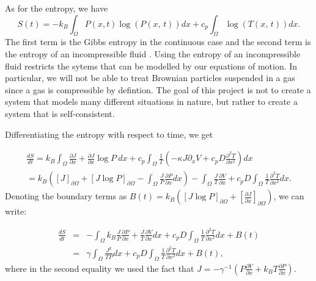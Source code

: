 As for the entropy, we have \cite{Streater1997a}
\begin{equation}
S(t) = -k_B \int_{\Omega} P(x, t) \log(P(x, \, t)) dx + c_p \int_{\Omega} \log(T(x, \, t)) dx.
\end{equation}
The first term is the Gibbs entropy in the continuous case \cite{Jaynes1965} and the second term is the entropy of an incompressible fluid \cite{CengelBoles1994}. Using the entropy of an incompressible fluid restricts the sytems that can be modelled by our equations of motion. In particular, we will not be able to treat Brownian particles suspended in a gas since a gas is compressible by defintion. The goal of this project is not to create a system that models many different situations in nature, but rather to create a system that is self-consistent.

Differentiating the entropy with respect to time, we get

\begin{align}
\frac{d S}{d t} =  k_B \int_{\Omega} \frac{\partial J}{\partial x} + \frac{\partial J}{\partial x} \log P \ dx + c_p \int_{\Omega} \frac{1}{T} \left(-\kappa J \partial_x V + c_p D \frac{\partial^2 T}{\partial x^2} \right) dx \\
                     = k_B \left ( [J]_{\partial \Omega} + [J \log P]_{\partial \Omega} - \int_{\Omega} \frac{J}{P} \frac{\partial P}{\partial x} dx \right) - \int_{\Omega} \frac{J}{T} \frac{\partial V}{\partial x} + c_p D \int_{\Omega} \frac{1}{T} \frac{\partial^2 T}{\partial x^2} dx.
\end{align}
Denoting the boundary terms as $B(t) = k_B( [J \log P]_{\partial \Omega} + \left[\frac{\partial J}{\partial x} \right]_{\partial \Omega} ) $, we can write:

\begin{eqnarray}
\frac{d S}{d t} & = & - \int_{\Omega} k_B \frac{J}{P} \frac{\partial P}{\partial x} + \frac{J}{T} \frac{\partial V}{\partial x} dx +  c_p D \int_{\Omega} \frac{1}{T} \frac{\partial^2 T}{\partial x^2} dx + B(t) \\
                    & = & \gamma \int_{\Omega} \frac{J^2}{T P} dx + c_p D \int_{\Omega} \frac{1}{T} \frac{\partial^2 T}{\partial x^2} dx + B(t), \label{eqn:entropyGen}
\end{eqnarray}
where in the second equality we used the fact that $J = -\gamma^{-1} ( P \frac{\partial V}{\partial x} + k_B T \frac{\partial P}{\partial x})$.

